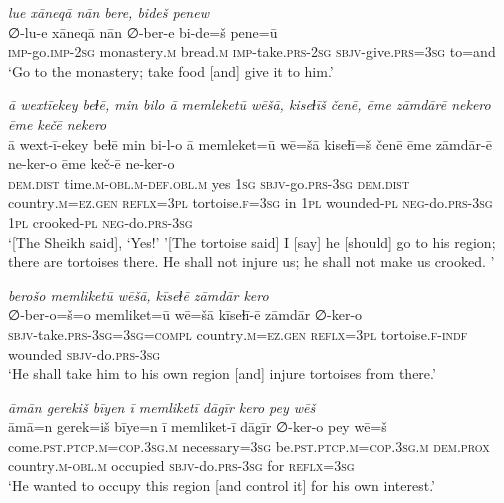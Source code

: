 \ea \label{DG.57}
\textit{lue xāneqā nān bere, bideš penew} \\ 
\gll ∅-lu-e xāneqā nān ∅-ber-e bi-de=š pene=ū \\ 
 \textsc{imp-}go.\textsc{imp-}\textsc{2sg} monastery\textsc{.m} bread\textsc{.m} \textsc{imp-}take\textsc{.prs}-\textsc{2sg} \textsc{sbjv-}give\textsc{.prs}\textsc{=3sg} to=and \\ 
\glt `Go to the monastery; take food [and] give it to him.'
\z 
 
\ea \label{DG.64}
\textit{ā wextīekey beɫē, min bilo ā memleketū wēšā, kiseɫīš čenē, ēme zāmdārē nekero ēme kečē nekero} \\ 
\gll ā wext-ī-ekey beɫē min bi-l-o ā memleket=ū wē=šā kiseɫī=š čenē ēme zāmdār-ē ne-ker-o ēme keč-ē ne-ker-o \\ 
 \textsc{dem.dist} time\textsc{.m}\textsc{-obl}\textsc{.m}\textsc{-def}\textsc{.obl}\textsc{.m} yes \textsc{1sg} \textsc{sbjv-}go\textsc{.prs}\textsc{-3sg} \textsc{dem.dist} country\textsc{.m}\textsc{=ez}\textsc{.gen} \textsc{reflx}\textsc{=3pl} tortoise\textsc{\textsc{.f}}\textsc{=3sg} in \textsc{1pl} wounded\textsc{\textsc{-pl}} \textsc{neg-}do\textsc{.prs}\textsc{-3sg} \textsc{1pl} crooked\textsc{\textsc{-pl}} \textsc{neg-}do\textsc{.prs}\textsc{-3sg} \\ 
\glt `[The Sheikh said], ‘Yes!' '[The tortoise said] I [say] he [should] go to his region; there are tortoises there. He shall not injure us; he shall not make us crooked. '
\z 
 
\ea \label{DG.65}
\textit{berošo memliketū wēšā, kīseɫē zāmdār kero} \\ 
\gll ∅-ber-o=š=o memliket=ū wē=šā kīseɫī-ē zāmdār ∅-ker-o \\ 
 \textsc{sbjv-}take\textsc{.prs}\textsc{-3sg}\textsc{=3sg}\textsc{=\textsc{compl}} country\textsc{.m}\textsc{=ez}\textsc{.gen} \textsc{reflx}\textsc{=3pl} tortoise\textsc{\textsc{.f}}\textsc{-indf} wounded \textsc{sbjv-}do\textsc{.prs}\textsc{-3sg} \\ 
\glt `He shall take him to his own region [and] injure tortoises from there.'
\z 
 
\ea \label{DP.5}
\textit{āmān gerekiš bīyen ī memliketī dāgīr kero pey wēš} \\ 
\gll āmā=n gerek=iš bīye=n ī memliket-ī dāgīr ∅-ker-o pey wē=š \\ 
 come\textsc{.pst}\textsc{.ptcp}\textsc{.m}\textsc{=cop}\textsc{.3sg}\textsc{.m} necessary\textsc{=3sg} be\textsc{.pst}\textsc{.ptcp}\textsc{.m}\textsc{=cop}\textsc{.3sg}\textsc{.m} \textsc{dem.prox} country\textsc{.m}\textsc{-obl}\textsc{.m} occupied \textsc{sbjv-}do\textsc{.prs}\textsc{-3sg} for \textsc{reflx}\textsc{=3sg} \\ 
\glt `He wanted to occupy this region [and control it] for his own interest.'
\z 
 
